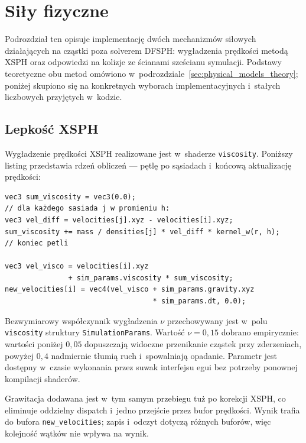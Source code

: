 \section{Siły fizyczne}
\label{sec:forces}

Podrozdział ten opisuje implementację dwóch mechanizmów siłowych działających
na cząstki poza solverem DFSPH: wygładzenia prędkości metodą XSPH oraz
odpowiedzi na kolizje ze ścianami sześcianu symulacji.
Podstawy teoretyczne obu metod omówiono w~podrozdziale~\ref{sec:physical_models_theory};
poniżej skupiono się na konkretnych wyborach implementacyjnych i~stałych
liczbowych przyjętych w~kodzie.

\subsection{Lepkość XSPH}
\label{subsec:xsph}

Wygładzenie prędkości XSPH realizowane jest w~shaderze \texttt{viscosity}.
Poniższy listing przedstawia rdzeń obliczeń --- pętlę po sąsiadach
i~końcową aktualizację prędkości:

\begin{lstlisting}[caption={Rdzeń shadera \texttt{viscosity} --- korekcja XSPH i~grawitacja},
                   label=lst:xsph,]
vec3 sum_viscosity = vec3(0.0);
// dla każdego sasiada j w promieniu h:
vec3 vel_diff = velocities[j].xyz - velocities[i].xyz;
sum_viscosity += mass / densities[j] * vel_diff * kernel_w(r, h);
// koniec petli

vec3 vel_visco = velocities[i].xyz
               + sim_params.viscosity * sum_viscosity;
new_velocities[i] = vec4(vel_visco + sim_params.gravity.xyz
                                   * sim_params.dt, 0.0);
\end{lstlisting}

Bezwymiarowy współczynnik wygładzenia $\nu$ przechowywany jest w~polu
\texttt{viscosity} struktury \texttt{SimulationParams}.
Wartość $\nu = 0{,}15$ dobrano empirycznie: wartości poniżej $0{,}05$
dopuszczają widoczne przenikanie cząstek przy zderzeniach,
powyżej $0{,}4$ nadmiernie tłumią ruch i~spowalniają opadanie.
Parametr jest dostępny w~czasie wykonania przez suwak interfejsu egui
bez potrzeby ponownej kompilacji shaderów.

Grawitacja dodawana jest w~tym samym przebiegu tuż po korekcji XSPH,
co eliminuje oddzielny dispatch i~jedno przejście przez bufor prędkości.
Wynik trafia do bufora \texttt{new\_velocities}; zapis i~odczyt dotyczą
różnych buforów, więc kolejność wątków nie wpływa na wynik.

